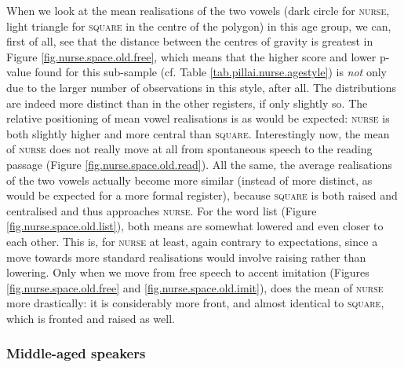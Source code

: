When we look at the mean realisations of the two vowels (dark circle for \textsc{nurse}, light triangle for \textsc{square} in the centre of the polygon) in this age group, we can, first of all, see that the distance between the centres of gravity is greatest in Figure \ref{fig.nurse.space.old.free}, which means that the higher  score and lower p-value found for this sub-sample (cf. Table \ref{tab.pillai.nurse.agestyle}) is \emph{not} only due to the larger number of observations in this style, after all.
The distributions are indeed more distinct than in the other registers, if only slightly so.
The relative positioning of mean vowel realisations is as would be expected: \textsc{nurse} is both slightly higher and more central than \textsc{square}.
Interestingly now, the mean of \textsc{nurse} does not really move at all from spontaneous speech to the reading passage (Figure \ref{fig.nurse.space.old.read}).
All the same, the average realisations of the two vowels actually become more similar (instead of more distinct, as would be expected for a more formal register), because \textsc{square} is both raised and centralised and thus approaches \textsc{nurse}.
For the word list (Figure \ref{fig.nurse.space.old.list}), both means are somewhat lowered and even closer to each other.
This is, for \textsc{nurse} at least, again contrary to expectations, since a move towards more standard realisations would involve raising rather than lowering.
Only when we move from free speech to accent imitation (Figures \ref{fig.nurse.space.old.free} and \ref{fig.nurse.space.old.imit}), does the mean of \textsc{nurse}  more drastically: it is considerably more front, and almost identical to \textsc{square}, which is fronted and raised as well.

\subsubsection{Middle-aged speakers}

